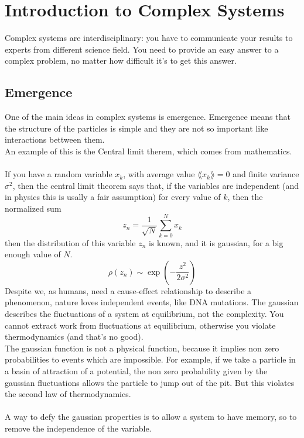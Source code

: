 \chapter{Introduction to Complex Systems}
Complex systems are interdisciplinary: you have to communicate your results to experts from different science field.
You need to provide an easy answer to a complex problem, no matter how difficult it's to get this answer.

\section{Emergence}
One of the main ideas in complex systems is emergence. Emergence means that the structure of the particles is simple and they are not so important like interactions bettween them. \\
An example of this is the Central limit therem, which comes from mathematics. \\ \\
If you have a random variable $x_k$, with average value $\lang x_k \rang = 0$ and finite variance $\sigma^2$, then the central limit theorem says that, if the variables are independent (and in physics this is usally a fair assumption) for every value of $k$, then the normalized sum 
$$
	z_n = \frac{1}{\sqrt{N}}\sum_{k=0}^N x_k
$$
then the distribution of this variable $z_n$ is known, and it is gaussian, for a big enough value of $N$.
$$
	\rho(z_n) \sim \exp\left(-\frac{z^2}{2\sigma^2}\right)
$$
Despite we, as humans, need a cause-effect relationship to describe a phenomenon, nature loves independent events, like DNA mutations.
The gaussian describes the fluctuations of a system at equilibrium, not the complexity. You cannot extract work from fluctuations at equilibrium, otherwise you violate thermodynamics (and that's no good). \\
The gaussian function is not a physical function, because it implies non zero probabilities to events which are impossible. For example, if we take a particle in a basin of attraction of a potential, the non zero probability given by the gaussian fluctuations allows the particle to jump out of the pit. But this violates the second law of thermodynamics. \\ \\
A way to defy the gaussian properties is to allow a system to have memory, so to remove the independence of the variable. 
